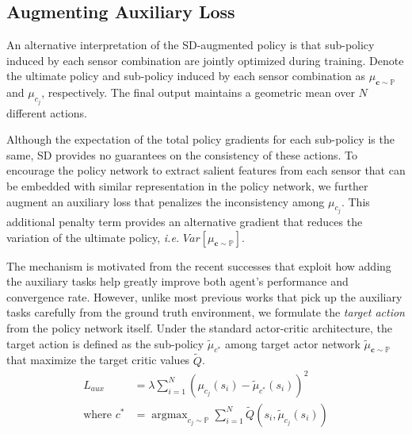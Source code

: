 \documentclass[../thesis.tex]{subfiles}
\begin{document}
\subsection{Augmenting Auxiliary Loss}
 
An alternative interpretation of the SD-augmented policy is that sub-policy induced by each sensor combination are jointly optimized during training. Denote the ultimate policy and sub-policy induced by each sensor combination as $\mu_{\mathbf{c}\sim \mathbb{P}}$ and $\mu_{c_j}$, respectively. The final output maintains a geometric mean over $N$ different actions.
 
Although the expectation of the total policy gradients for each sub-policy is the same, SD provides no guarantees on the consistency of these actions.
To encourage the policy network to extract salient features from each sensor that can be embedded with similar representation in the policy network, we further augment an auxiliary loss that penalizes the inconsistency among $\mu_{c_j}$.
This additional penalty term provides an alternative gradient that reduces the variation of the ultimate policy, \textit{i.e.} $Var \left[ \mu_{\mathbf{c}\sim \mathbb{P}} \right]$.
 
The mechanism is motivated from the recent successes \cite{DBLP:journals/corr/GuLGTL16,mirowski2017a,lample2016playing,dosovitskiy2016learning} that exploit how adding the auxiliary tasks help greatly improve both agent's performance and convergence rate. However, unlike most previous works that pick up the auxiliary tasks carefully from the ground truth environment, we formulate the \textit{target action} from the policy network itself.
Under the standard actor-critic architecture, the target action is defined as the sub-policy $\tilde{\mu}_{c^{*}}$ among target actor network $\tilde{\mu}_{\mathbf{c}\sim \mathbb{P}}$ that maximize the target critic values $\tilde{Q}$.
\begin{align}
L_{aux} &= \lambda \sum_{i=1}^N (\mu_{c_j}(s_i)-\tilde{\mu}_{c^{*}}(s_i))^2 \\
\text{where  } c^{*} &= \mathop{\mathrm{argmax}}_{c_j \sim \mathbb{P}} \sum_{i=1}^N \tilde{Q}(s_i,\tilde{\mu}_{c_j}(s_i))
\end{align}
 
\end{document}
